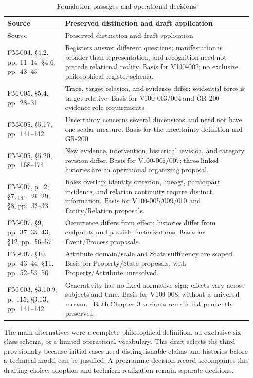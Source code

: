 \documentclass[11pt,a4paper]{article}
\begin{document}
\begin{longtable}{@{}L{0.28\textwidth}L{0.62\textwidth}@{}}
\caption{Foundation passages and operational decisions}\label{tab:gr100-t}\\
\toprule
Source & Preserved distinction and draft application \\
\midrule\endfirsthead
\toprule
Source & Preserved distinction and draft application \\
\midrule\endhead
FM-004, \S4.2, pp.~11--14; \S4.6, pp.~43--45 & Registers answer different questions; manifestation is broader than representation, and recognition need not precede relational reality. Basis for V100-002; no exclusive philosophical register schema. \\
FM-005, \S5.4, pp.~28--31 & Trace, target relation, and evidence differ; evidential force is target-relative. Basis for V100-003/004 and GR-200 evidence-role requirements. \\
FM-005, \S5.17, pp.~141--142 & Uncertainty concerns several dimensions and need not have one scalar measure. Basis for the uncertainty definition and GR-200. \\
FM-005, \S5.20, pp.~168--174 & New evidence, intervention, historical revision, and category revision differ. Basis for V100-006/007; three linked histories are an operational organizing proposal. \\
FM-007, p.~2; \S7, pp.~26--29; \S8, pp.~32--33 & Roles overlap; identity criterion, lineage, participant incidence, and relation continuity require distinct information. Basis for V100-005/009/010 and Entity/Relation proposals. \\
FM-007, \S9, pp.~37--38, 43; \S12, pp.~56--57 & Occurrence differs from effect; histories differ from endpoints and possible factorizations. Basis for Event/Process proposals. \\
FM-007, \S10, pp.~43--44; \S11, pp.~52--53, 56 & Attribute domain/scale and State sufficiency are scoped. Basis for Property/State proposals, with Property/Attribute unresolved. \\
FM-003, \S3.10.9, p.~115; \S3.13, pp.~141--142 & Generativity has no fixed normative sign; effects vary across subjects and time. Basis for V100-008, without a universal measure. Both Chapter 3 variants remain independently preserved. \\
\bottomrule
\end{longtable}

The main alternatives were a complete philosophical definition, an exclusive six-class schema, or a limited operational vocabulary. This draft selects the third provisionally because initial cases need distinguishable claims and histories before a technical model can be justified. A programme decision record accompanies this drafting choice; adoption and technical realization remain separate decisions.
\end{document}

